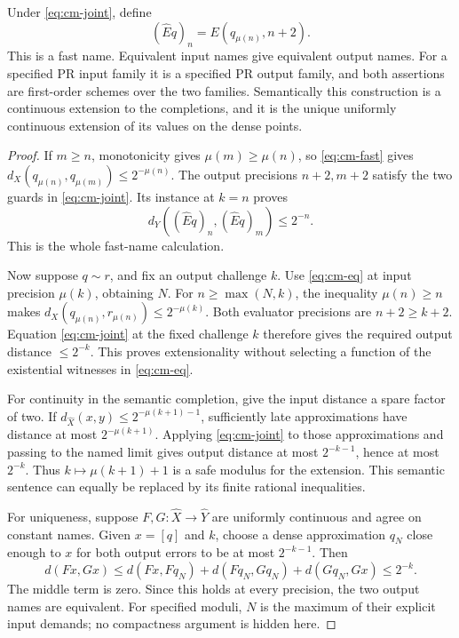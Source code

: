 \begin{theorem}
\label{thm:cm-extension}
Under \eqref{eq:cm-joint}, define
\[
             (\widehat E q)_n=E(q_{\mu(n)},n+2).
\tag{C4}\label{eq:cm-extension}
\]
This is a fast name.  Equivalent input names give equivalent output names.
For a specified PR input family it is a specified PR output family, and both
assertions are first-order schemes over the two families.  Semantically this
construction is a continuous extension to the completions, and it is the
unique uniformly continuous extension of its values on the dense points.
\end{theorem}

\begin{proof}
If $m\geq n$, monotonicity gives $\mu(m)\geq\mu(n)$, so
\eqref{eq:cm-fast} gives
$d_X(q_{\mu(n)},q_{\mu(m)})\leq2^{-\mu(n)}$.
The output precisions $n+2,m+2$ satisfy the two guards in
\eqref{eq:cm-joint}.  Its instance at $k=n$ proves
\[
      d_Y((\widehat E q)_n,(\widehat E q)_m)\leq2^{-n}.
\]
This is the whole fast-name calculation.

Now suppose $q\sim r$, and fix an output challenge $k$.  Use
\eqref{eq:cm-eq} at input precision $\mu(k)$, obtaining $N$.  For
$n\geq\max(N,k)$, the inequality $\mu(n)\geq n$ makes
$d_X(q_{\mu(n)},r_{\mu(n)})\leq2^{-\mu(k)}$.  Both evaluator precisions
are $n+2\geq k+2$.  Equation \eqref{eq:cm-joint} at the fixed challenge $k$
therefore gives the required output distance $\leq2^{-k}$.  This proves
extensionality without selecting a function of the existential witnesses in
\eqref{eq:cm-eq}.

For continuity in the semantic completion, give the input distance a spare
factor of two.  If
$d_{\widehat X}(x,y)\leq2^{-\mu(k+1)-1}$, sufficiently late approximations
have distance at most $2^{-\mu(k+1)}$.  Applying
\eqref{eq:cm-joint} to those approximations and passing to the named limit
gives output distance at most $2^{-k-1}$, hence at most $2^{-k}$.  Thus
$k\mapsto\mu(k+1)+1$ is a safe modulus for the extension.  This semantic
sentence can equally be replaced by its finite rational inequalities.

For uniqueness, suppose $F,G:\widehat X\to\widehat Y$ are uniformly
continuous and agree on constant names.  Given $x=[q]$ and $k$, choose a dense
approximation $q_N$ close enough to $x$ for both output errors to be at most
$2^{-k-1}$.  Then
\[
 d(Fx,Gx)\leq d(Fx,Fq_N)+d(Fq_N,Gq_N)+d(Gq_N,Gx)\leq2^{-k}.
\]
The middle term is zero.  Since this holds at every precision, the two output
names are equivalent.  For specified moduli, $N$ is the maximum of their
explicit input demands; no compactness argument is hidden here.
\end{proof}

